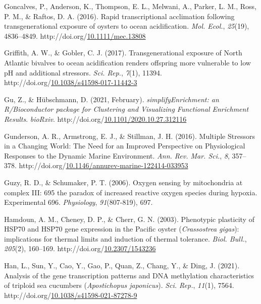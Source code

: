 \documentclass [11pt, proquest] {uwthesis}[2015/03/03]
\newlength{\cslhangindent}
\newenvironment{CSLReferences}%
{\setlength{\parindent}{0pt}%
\everypar{\setlength{\hangindent}{\cslhangindent}}\ignorespaces}%
{\par}
\begin{document}
\begin{CSLReferences}{1}{0}
\leavevmode\hypertarget{ref-Goncalves2016}{}%
Goncalves, P., Anderson, K., Thompson, E. L., Melwani, A., Parker, L. M., Ross, P. M., \& Raftos, D. A. (2016). {Rapid transcriptional acclimation following transgenerational exposure of oysters to ocean acidification}. \emph{Mol. Ecol.}, \emph{25}(19), 4836--4849. http://doi.org/\href{https://doi.org/10.1111/mec.13808}{10.1111/mec.13808}

\leavevmode\hypertarget{ref-Griffith2017}{}%
Griffith, A. W., \& Gobler, C. J. (2017). {Transgenerational exposure of North Atlantic bivalves to ocean acidification renders offspring more vulnerable to low pH and additional stressors}. \emph{Sci. Rep.}, \emph{7}(1), 11394. http://doi.org/\href{https://doi.org/10.1038/s41598-017-11442-3}{10.1038/s41598-017-11442-3}

\leavevmode\hypertarget{ref-Gu2021}{}%
Gu, Z., \& Hübschmann, D. (2021, February). \emph{{simplifyEnrichment: an R/Bioconductor package for Clustering and Visualizing Functional Enrichment Results}}. \emph{bioRxiv}. http://doi.org/\href{https://doi.org/10.1101/2020.10.27.312116}{10.1101/2020.10.27.312116}

\leavevmode\hypertarget{ref-Gunderson2016}{}%
Gunderson, A. R., Armstrong, E. J., \& Stillman, J. H. (2016). {Multiple Stressors in a Changing World: The Need for an Improved Perspective on Physiological Responses to the Dynamic Marine Environment}. \emph{Ann. Rev. Mar. Sci.}, \emph{8}, 357--378. http://doi.org/\href{https://doi.org/10.1146/annurev-marine-122414-033953}{10.1146/annurev-marine-122414-033953}

\leavevmode\hypertarget{ref-Guzy2006}{}%
Guzy, R. D., \& Schumaker, P. T. (2006). {Oxygen sensing by mitochondria at complex III: 695 the paradox of increased reactive oxygen species during hypoxia. Experimental 696}. \emph{Physiology}, \emph{91}(807-819), 697.

\leavevmode\hypertarget{ref-Hamdoun2003}{}%
Hamdoun, A. M., Cheney, D. P., \& Cherr, G. N. (2003). {Phenotypic plasticity of HSP70 and HSP70 gene expression in the Pacific oyster (\emph{Crassostrea gigas}): implications for thermal limits and induction of thermal tolerance}. \emph{Biol. Bull.}, \emph{205}(2), 160--169. http://doi.org/\href{https://doi.org/10.2307/1543236}{10.2307/1543236}

\leavevmode\hypertarget{ref-Han2021}{}%
Han, L., Sun, Y., Cao, Y., Gao, P., Quan, Z., Chang, Y., \& Ding, J. (2021). {Analysis of the gene transcription patterns and DNA methylation characteristics of triploid sea cucumbers (\emph{Apostichopus japonicus})}. \emph{Sci. Rep.}, \emph{11}(1), 7564. http://doi.org/\href{https://doi.org/10.1038/s41598-021-87278-9}{10.1038/s41598-021-87278-9}


\end{CSLReferences}
\end{document}
